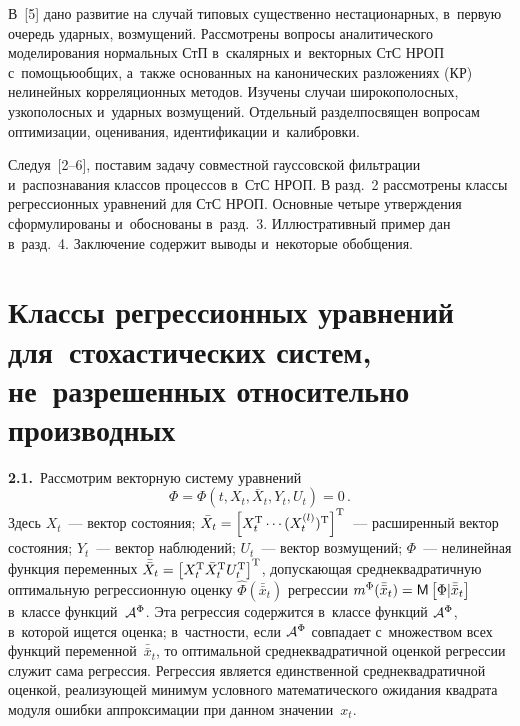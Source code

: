 \begin{multicols}{2}
{}

В~[5] дано развитие на случай типовых существенно нестационарных, в~первую очередь ударных, возмущений.
Рассмотрены вопросы аналитического моделирования нормальных СтП в~\mbox{скалярных} и~векторных СтС 
НРОП с~помощью\linebreak общих, а~также основанных на канонических разложениях (КР) нелинейных 
корреляционных методов. Изучены случаи широкополосных, узкополосных и~ударных возмущений. 
Отдельный \mbox{раздел}\linebreak посвящен вопросам оптимизации, оценивания, идентификации и~калибровки.

Следуя~[2--6], поставим задачу совместной гауссовской фильтрации и~распознавания классов 
процессов в~СтС НРОП.
В разд.~2 рассмотрены классы регрессионных уравнений для СтС НРОП. Основные четыре утверж\-де\-ния 
сформулированы и~обосно\-ва\-ны в~разд.~3. Иллюстративный пример дан в~разд.~4. 
Заключение содержит выводы и~некоторые обобщения.

\vspace*{-6pt}

\section{Классы регрессионных уравнений для~стохастических систем, не~разрешенных относительно производных}

\vspace*{-1pt}

\textbf{2.1.}\ Рассмотрим векторную систему уравнений
    \begin{equation}
    \Phi = \Phi \left( t, X_t, \bar X_t, Y_t, U_t \right)=0\,.
    \label{e2.1-sin}
    \end{equation}
Здесь $X_t$~--- вектор состояния; $\bar X_t \hm= \lk X_t^{\mathrm{T}} \cdots (X_t^{(l)})^{\mathrm{T}}\rk^{\mathrm{T}}$~--- 
расширенный вектор состояния; $Y_t$~--- вектор наблюдений; $U_t$~--- вектор возмущений; $\Phi$~--- 
нелинейная функция переменных $\bar{\bar X}_t\hm = \lk X_t^{\mathrm{T}} \bar X_t^{\mathrm{T}} U_t^{\mathrm{T}}\rk^{\mathrm{T}}$, 
допускающая среднеквадратичную  оптимальную регрессионную оценку $\hat\Phi (\bar{\bar x}_t)$
 регрессии  $m^\Phi (\bar{\bar x}_t)\hm= \mathsf{M} \lk \Phi | \bar{\bar x}_t\rk$ 
 в~классе функций~${\cal A}^\Phi$. Эта регрессия содержится в~классе функций ${\cal A}^\Phi$,
  в~которой ищется оценка; в~частности, если ${\cal A}^\Phi$ совпадает с~множеством 
  всех функций переменной~$\bar{\bar x}_t$, то оптимальной среднеквадратичной  оценкой регрессии
   служит сама регрессия. Регрессия является единственной среднеквадратичной оценкой, 
   реализующей минимум условного математического ожидания квадрата модуля ошибки аппроксимации 
   при данном значении~$x_t$.


\end{multicols}
